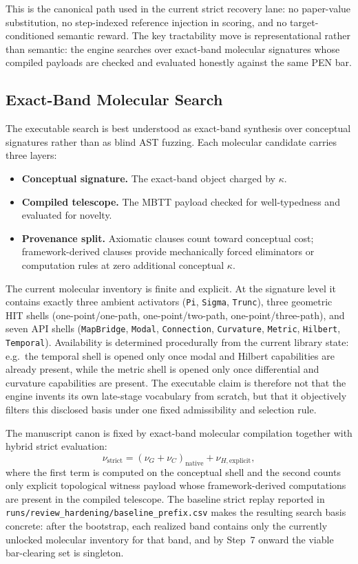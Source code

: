 \documentclass[11pt,a4paper]{article}
\theoremstyle{plain}
\theoremstyle{definition}
\theoremstyle{remark}
\begin{document}
This is the canonical path used in the current strict recovery lane: no paper-value substitution, no step-indexed reference injection in scoring, and no target-conditioned semantic reward.
The key tractability move is representational rather than semantic: the engine searches over exact-band molecular signatures whose compiled payloads are checked and evaluated honestly against the same PEN bar.

\subsection{Exact-Band Molecular Search}
\label{sec:mdp-mcts}

The executable search is best understood as exact-band synthesis over conceptual signatures rather than as blind AST fuzzing.
Each molecular candidate carries three layers:
\begin{itemize}[nosep]
    \item \textbf{Conceptual signature.} The exact-band object charged by $\kappa$.
    \item \textbf{Compiled telescope.} The MBTT payload checked for well-typedness and evaluated for novelty.
    \item \textbf{Provenance split.} Axiomatic clauses count toward conceptual cost; framework-derived clauses provide mechanically forced eliminators or computation rules at zero additional conceptual $\kappa$.
\end{itemize}

The current molecular inventory is finite and explicit.
At the signature level it contains exactly three ambient activators (\texttt{Pi}, \texttt{Sigma}, \texttt{Trunc}), three geometric HIT shells (one-point/one-path, one-point/two-path, one-point/three-path), and seven API shells (\texttt{MapBridge}, \texttt{Modal}, \texttt{Connection}, \texttt{Curvature}, \texttt{Metric}, \texttt{Hilbert}, \texttt{Temporal}).
Availability is determined procedurally from the current library state: e.g.\ the temporal shell is opened only once modal and Hilbert capabilities are already present, while the metric shell is opened only once differential and curvature capabilities are present.
The executable claim is therefore not that the engine invents its own late-stage vocabulary from scratch, but that it objectively filters this disclosed basis under one fixed admissibility and selection rule.

The manuscript canon is fixed by exact-band molecular compilation together with hybrid strict evaluation:
\[
  \nu_{\mathrm{strict}} = (\nu_G+\nu_C)_{\mathrm{native}} + \nu_{H,\mathrm{explicit}},
\]
where the first term is computed on the conceptual shell and the second counts only explicit topological witness payload whose framework-derived computations are present in the compiled telescope.
The baseline strict replay reported in \texttt{runs/review\_hardening/baseline\_prefix.csv} makes the resulting search basis concrete: after the bootstrap, each realized band contains only the currently unlocked molecular inventory for that band, and by Step~7 onward the viable bar-clearing set is singleton.
\end{document}

